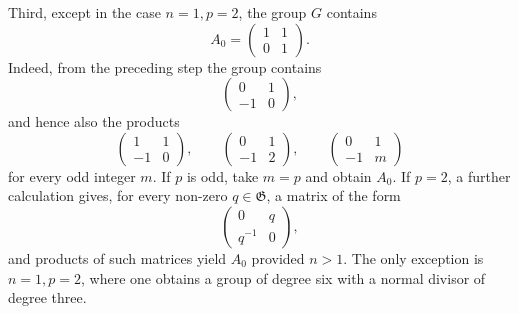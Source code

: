 \documentclass[11pt]{article}
\begin{document}
Third, except in the case \(n=1,p=2\), the group \(G\) contains
\begin{equation}\label{eq:66-A0}
 A_0=\begin{pmatrix}1&1\\0&1\end{pmatrix}.
\end{equation}
Indeed, from the preceding step the group contains
\[
 \begin{pmatrix}0&1\\-1&0\end{pmatrix},
\]
and hence also the products
\[
 \begin{pmatrix}1&1\\-1&0\end{pmatrix},
 \qquad
 \begin{pmatrix}0&1\\-1&2\end{pmatrix},
 \qquad
 \begin{pmatrix}0&1\\-1&m\end{pmatrix}
\]
for every odd integer \(m\).  If \(p\) is odd, take \(m=p\) and obtain \(A_0\).  If \(p=2\), a further calculation gives, for every non-zero \(q\in\mathfrak G\), a matrix of the form
\[
 \begin{pmatrix}0&q\\q^{-1}&0\end{pmatrix},
\]
and products of such matrices yield \(A_0\) provided \(n>1\).  The only exception is \(n=1,p=2\), where one obtains a group of degree six with a normal divisor of degree three.
\end{document}
